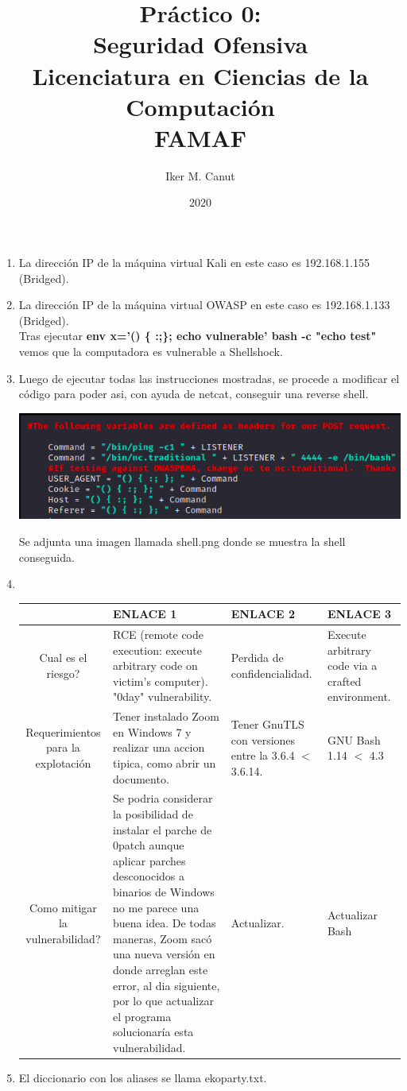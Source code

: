 \documentclass[11pt,a4paper]{article}
\author{Iker M. Canut}
\title{Pr\'actico 0: \\ Seguridad Ofensiva\\Licenciatura en Ciencias de la Computaci\'on\\ FAMAF}
\date{2020}
\begin{document}
\maketitle
\newpage

\begin{enumerate}

\item La direcci\'on IP de la m\'aquina virtual Kali en este caso es 192.168.1.155 (Bridged).
\item La direcci\'on IP de la m\'aquina virtual OWASP en este caso es 192.168.1.133 (Bridged).\\
Tras ejecutar \textbf{env x='() \{ :;\}; echo vulnerable' bash -c "echo test"} vemos que la computadora es vulnerable a Shellshock.
\item Luego de ejecutar todas las instrucciones mostradas, se procede a modificar el c\'odigo para poder asi, con ayuda de netcat, conseguir una reverse shell.
\begin{center}
\includegraphics[scale=.6]{codigo.png}\\
\end{center}
Se adjunta una imagen llamada shell.png donde se muestra la shell conseguida.


\item $\ \ $
\begin{table}[h]
\begin{center}
\begin{tabular}{|S|L|M|M|}
\hline
& ENLACE 1 & ENLACE 2 & ENLACE 3\\
\hline
Cual es el riesgo? & RCE (remote code execution: execute arbitrary code on victim's computer). "0day" vulnerability. & Perdida de confidencialidad. &  Execute arbitrary code via a crafted environment.\\
\hline
Requerimientos para la explotaci\'on & Tener instalado Zoom en Windows 7 y realizar una accion tipica, como abrir un documento. & Tener GnuTLS con versiones entre la 3.6.4 $<$ 3.6.14. & GNU Bash 1.14 $<$ 4.3\\
\hline
Como mitigar la vulnerabilidad? & Se podria considerar la posibilidad de instalar el parche de 0patch aunque aplicar parches desconocidos a binarios de Windows no me parece una buena idea. De todas maneras, Zoom sac\'o una nueva versi\'on en donde arreglan este error, al dia siguiente, por lo que actualizar el programa solucionar\'ia esta vulnerabilidad. & Actualizar. & Actualizar Bash\\
\hline
\end{tabular}
\end{center}
\end{table}
\item El diccionario con los aliases se llama ekoparty.txt.


\end{enumerate}
\end{document}

